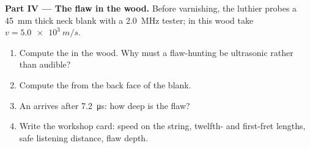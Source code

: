 \begin{problem}
\medskip
\noindent\textbf{Part IV --- The flaw in the wood.}
Before varnishing, the luthier probes a \qty{45}{mm} thick neck
blank with a \qty{2.0}{MHz} tester; in this wood take $v = \qty{5.0e3}{m/s}$.
\begin{enumerate}[resume]
  \item Compute the   in the wood. Why must a
        flaw-hunting  be ultrasonic rather than audible?
  \item Compute the   from the back face of the blank.
  \item An  arrives after \qty{7.2}{\micro s}: how deep is the flaw?
  \item Write the workshop card:  speed on the string, twelfth-
        and first-fret lengths, safe listening distance, flaw depth.
\end{enumerate}
\end{problem}

